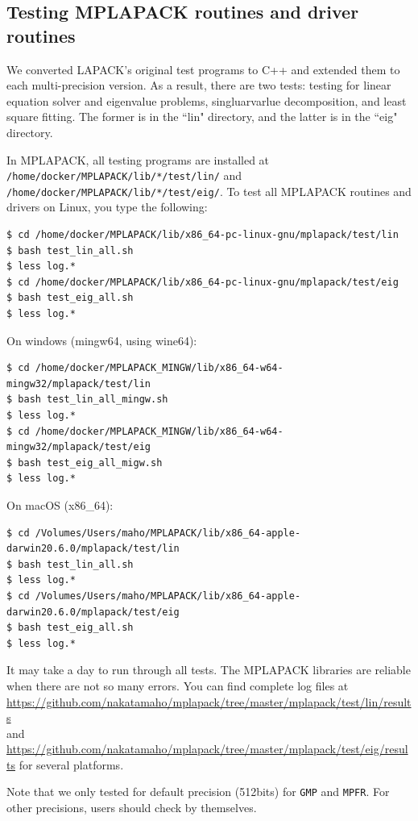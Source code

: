 \documentclass[12pt]{article}
\begin{document}
\subsection{Testing MPLAPACK routines and driver routines}
We converted LAPACK's original test programs to C++ and extended them to each multi-precision version. As a result, there are two tests: testing for linear equation solver and eigenvalue problems, singluarvarlue decomposition, and least square fitting. The former is in the ``lin" directory, and the latter is in the ``eig" directory.

In MPLAPACK, all testing programs are installed at {\tt /home/docker/MPLAPACK/lib/*/test/lin/} and \\
 {\tt /home/docker/MPLAPACK/lib/*/test/eig/}. To test all MPLAPACK routines and drivers on Linux, you type the following:
\begin{verbatim}
$ cd /home/docker/MPLAPACK/lib/x86_64-pc-linux-gnu/mplapack/test/lin
$ bash test_lin_all.sh
$ less log.*
$ cd /home/docker/MPLAPACK/lib/x86_64-pc-linux-gnu/mplapack/test/eig
$ bash test_eig_all.sh
$ less log.*
\end{verbatim}
On windows (mingw64, using wine64):
\begin{verbatim}
$ cd /home/docker/MPLAPACK_MINGW/lib/x86_64-w64-mingw32/mplapack/test/lin
$ bash test_lin_all_mingw.sh
$ less log.*
$ cd /home/docker/MPLAPACK_MINGW/lib/x86_64-w64-mingw32/mplapack/test/eig
$ bash test_eig_all_migw.sh
$ less log.*
\end{verbatim}
On macOS (x86\_64):
\begin{verbatim}
$ cd /Volumes/Users/maho/MPLAPACK/lib/x86_64-apple-darwin20.6.0/mplapack/test/lin
$ bash test_lin_all.sh
$ less log.*
$ cd /Volumes/Users/maho/MPLAPACK/lib/x86_64-apple-darwin20.6.0/mplapack/test/eig
$ bash test_eig_all.sh
$ less log.*
\end{verbatim}

It may take a day to run through all tests. The MPLAPACK libraries are reliable when there are not so many errors.
You can find complete log files at \url{https://github.com/nakatamaho/mplapack/tree/master/mplapack/test/lin/results} \\
and \url{https://github.com/nakatamaho/mplapack/tree/master/mplapack/test/eig/results} for several platforms.

Note that we only tested for default precision (512bits) for {\tt GMP} and {\tt MPFR}. For other precisions, users should check by themselves.
\end{document}
